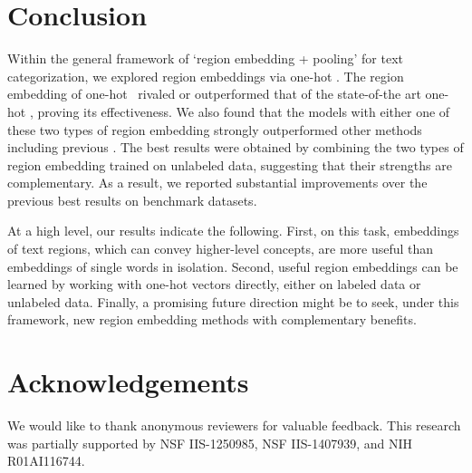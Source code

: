 \documentclass{article}
\begin{document}
\section{Conclusion}
\label{sec:conc}


Within the general framework of `region embedding + pooling' for text categorization, 
we explored region embeddings via one-hot \lstm. 
The region embedding of one-hot \lstm\ rivaled or outperformed that of the state-of-the art one-hot \cnn, proving its
effectiveness. 
We also found that the models with either one of these two types of region embedding 
strongly outperformed other methods including previous \lstm. 
The best results were obtained by combining the two types of region embedding 
trained on unlabeled data, 
suggesting that their strengths are complementary.  
As a result, we reported substantial improvements over the previous best results 
on benchmark datasets. 

At a high level, 
our results indicate the following.  
First, on this task, embeddings of text regions, which can convey higher-level concepts, are more useful than embeddings of single words in isolation.  
Second, useful region embeddings can be learned by working with one-hot vectors directly, 
either on labeled data or unlabeled data.  
Finally, a promising future direction might be to seek, under this framework, 
new region embedding methods with complementary benefits.  



\iffalse
On text tasks, it appears to be almost customary to have a word embedding layer 
to produce input to \lstm\ (as well as \cnn). 
Going against the trend, 
the work presented in this paper was centered around the notion of one-hot \lstm, which eliminates the word embedding layer.  
We first showed that in the supervised setting, there is nothing to gain by inclusion of a word embedding, 
and it could rather degrade performance as an extra layer makes training harder.  
If a word embedding was appropriately pre-trained with unlabeled data, 
inclusion of such a word embedding is a form of semi-supervised learning and could be useful.  
However, we showed that it is more effective to train one-hot \lstms\ on unlabeled data 
and use the obtained embeddings of text regions as input to \lstm\ or one-hot \cnn.  
Our results indicate that for text categorization, 
embeddings of text regions, either in the form of \lstm\ or a convolution layer, 
are more useful than embeddings of single words in isolation.  
A promising future direction may be to use region embeddings for other NLP applications. 
\fi

\section*{Acknowledgements} 
We would like to thank anonymous reviewers for valuable feedback. 
This research was partially supported by NSF IIS-1250985, NSF IIS-1407939, and NIH R01AI116744.



\end{document}
